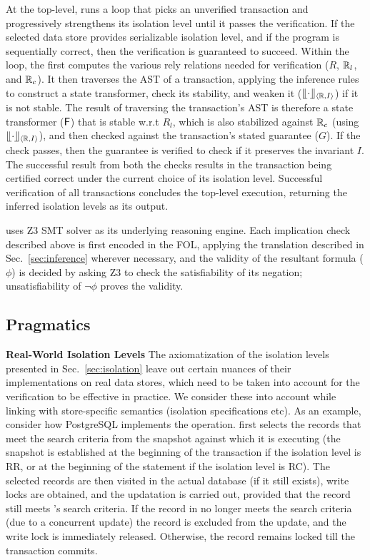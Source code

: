 At the top-level, \tool runs a loop that picks an unverified
transaction and progressively strengthens its isolation level until it
passes the verification. If the selected data store provides
serializable isolation level, and if the program is sequentially
correct, then the verification is guaranteed to succeed. Within the
loop, the \tool first computes the various rely relations needed for
verification ($R$, $\mathbb{R}_l$, and $\mathbb{R}_c$). It then traverses the AST of a
transaction, applying the inference rules to construct a state
transformer, check its stability, and weaken it ($\llfloor \cdot \rrfloor_{\langle \mathbb{R},I \rangle}$)
if it is not stable. The result of traversing the transaction's AST is
therefore a state transformer (${\sf F}$) that is stable w.r.t $R_l$, which
is also stabilized against $\mathbb{R}_c$ (using $\llfloor \cdot \rrfloor_{\langle \mathbb{R},I \rangle}$), and
then checked against the transaction's stated guarantee ($G$). If the
check passes, then the guarantee is verified to check if it preserves
the invariant $I$. The successful result from both the checks results
in the transaction being certified correct under the current choice of
its isolation level. Successful verification of all transactions
concludes the top-level execution, returning the inferred isolation
levels as its output.

\tool uses Z3 SMT solver as its underlying reasoning engine. Each
implication check described above is first encoded in the FOL,
applying the translation described in Sec.~\ref{sec:inference}
wherever necessary, and the validity of the resultant formula ($\phi$)
is decided by asking Z3 to check the satisfiability of its negation;
unsatisfiability of $\neg\phi$ proves the validity.

\subsection{Pragmatics}

\textbf{Real-World Isolation Levels} The axiomatization of the
isolation levels presented in Sec.~\ref{sec:isolation} leave out
certain nuances of their implementations on real data stores, which
need to be taken into account for the verification to be effective in
practice.  We consider these into account while linking \tool with
store-specific semantics (isolation specifications etc). As an
example, consider how PostgreSQL implements the  operation.
 first selects the records that meet the search criteria
from the snapshot against which it is executing (the snapshot is
established at the beginning of the transaction if the isolation level
is RR, or at the beginning of the  statement if the
isolation level is RC). The selected records are then visited in the
actual database (if it still exists), write locks are obtained, and
the updatation is carried out, provided that the record still meets
's search criteria. If the record in no longer meets the
search criteria (due to a concurrent update) the record is excluded
from the update, and the write lock is immediately released.
Otherwise, the record remains locked till the transaction commits. 

